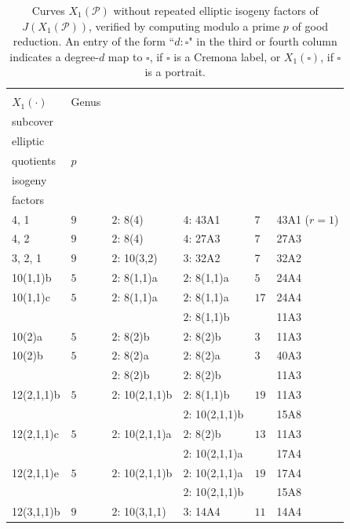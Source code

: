 \documentclass[12pt]{amsart}
\theoremstyle{definition}
\numberwithin{equation}{section}
\begin{document}
\begin{table}
\centering
\begin{tabular}{|l|l|l|l|l|l|}
 \hline
 \Shortunderstack{Curve \\ $X_1(\cdot)$} & Genus & \Shortunderstack{Degree-$d$\\subcover} & \Shortunderstack{Degree-$d$\\elliptic\\quotients} & $p$ & \Shortunderstack{Elliptic\\ isogeny\\factors} \\
 \hline \hline
 4, 1 & $9$ & $2$: 8(4) & 4: 43A1 & $7$ & 43A1 ($r=1$)\\
 \hline
 4, 2 & $9$ & $2$: 8(4) & $4$: 27A3 & $7$ & 27A3\\
 \hline
 3, 2, 1 & $9$ & $2$: 10(3,2) & $3$: 32A2 & 7 &32A2\\
 \hline\hline
 10(1,1)b & $5$ & $2$: 8(1,1)a & $2$: 8(1,1)a & $5$ & 24A4\\
 \hline
 10(1,1)c & $5$ & $2$: 8(1,1)a & $2$: 8(1,1)a & $17$ & 24A4\\
 & & & $2$: 8(1,1)b & & 11A3 \\
 \hline
 10(2)a & $5$ & $2$: 8(2)b & $2$: 8(2)b & $3$ & 11A3\\
 \hline
 10(2)b & $5$ & $2$: 8(2)a & $2$: 8(2)a & $3$ & 40A3\\
  & & $2$: 8(2)b & $2$: 8(2)b & & 11A3\\
 \hline
 12(2,1,1)b & $5$ & $2$: 10(2,1,1)b & $2$: 8(1,1)b & $19$ & 11A3\\
  & & & $2$: 10(2,1,1)b & & 15A8\\
 \hline
 12(2,1,1)c & $5$ & $2$: 10(2,1,1)a & $2$: 8(2)b& $13$ & 11A3\\
  & & & $2$: 10(2,1,1)a & & 17A4\\
 \hline
 12(2,1,1)e & $5$ & $2$: 10(2,1,1)b & $2$: 10(2,1,1)a & $19$ & 17A4\\
  & & & $2$: 10(2,1,1)b & & 15A8\\
 \hline
 12(3,1,1)b & $9$ & $2$: 10(3,1,1) & $3$: 14A4 & $11$ & 14A4\\
 \hline

\end{tabular}
\caption{Curves $X_1(\mathcal{P})$ without repeated elliptic isogeny factors of $J(X_1(\mathcal{P}))$, verified by computing modulo a prime $p$ of good reduction. An entry of the form ``$d: \square$" in the third or fourth column indicates a degree-$d$ map to $\square$, if $\square$ is a Cremona label, or $X_1(\square)$, if $\square$ is a portrait.}
\label{table:no repeated elliptic factors}
\end{table}
\end{document}
